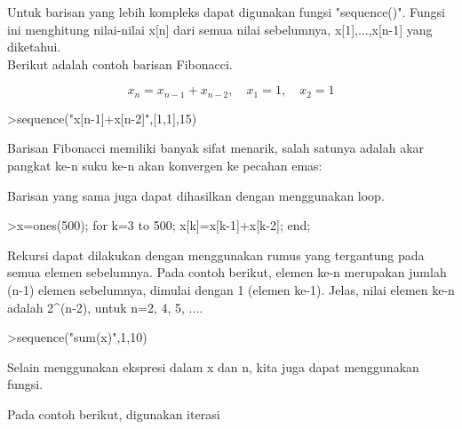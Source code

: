 \documentclass[a4paper,10pt]{article}
\begin{document}
\begin{eulernotebook}
\begin{eulercomment}
\begin{eulercomment}
\begin{eulercomment}
\begin{eulercomment}
\begin{eulercomment}
\begin{eulercomment}
\begin{eulercomment}
\begin{eulercomment}
\begin{eulercomment}
\begin{eulercomment}
\begin{eulercomment}
\begin{eulercomment}
\begin{eulercomment}
\begin{eulercomment}
\begin{eulercomment}
Untuk barisan yang lebih kompleks dapat digunakan fungsi "sequence()".
Fungsi ini menghitung nilai-nilai x[n] dari semua nilai sebelumnya,
x[1],...,x[n-1] yang diketahui.\\
Berikut adalah contoh barisan Fibonacci.

\end{eulercomment}
\begin{eulerformula}
\[
x_n = x_{n-1}+x_{n-2}, \quad x_1=1, \quad x_2 =1
\]
\end{eulerformula}
\begin{eulerprompt}
>sequence("x[n-1]+x[n-2]",[1,1],15)
\end{eulerprompt}
\begin{euleroutput}
  [1,  1,  2,  3,  5,  8,  13,  21,  34,  55,  89,  144,  233,  377,  610]
\end{euleroutput}
\begin{eulercomment}
Barisan Fibonacci memiliki banyak sifat menarik, salah satunya adalah
akar pangkat ke-n suku ke-n akan konvergen ke pecahan emas:
\end{eulercomment}
\begin{eulercomment}
Barisan yang sama juga dapat dihasilkan dengan menggunakan loop.
\end{eulercomment}
\begin{eulerprompt}
>x=ones(500); for k=3 to 500; x[k]=x[k-1]+x[k-2]; end;
\end{eulerprompt}
\begin{eulercomment}
Rekursi dapat dilakukan dengan menggunakan rumus yang tergantung pada
semua elemen sebelumnya. Pada contoh berikut, elemen ke-n merupakan
jumlah (n-1) elemen sebelumnya, dimulai dengan 1 (elemen ke-1). Jelas,
nilai elemen ke-n adalah 2\textasciicircum{}(n-2), untuk n=2, 4, 5, ....
\end{eulercomment}
\begin{eulerprompt}
>sequence("sum(x)",1,10)
\end{eulerprompt}
\begin{euleroutput}
  [1,  1,  2,  4,  8,  16,  32,  64,  128,  256]
\end{euleroutput}
\begin{eulercomment}
Selain menggunakan ekspresi dalam x dan n, kita juga dapat menggunakan
fungsi.

Pada contoh berikut, digunakan iterasi


\end{eulercomment}
\end{eulercomment}
\end{eulercomment}
\end{eulercomment}
\end{eulercomment}
\end{eulercomment}
\end{eulercomment}
\end{eulercomment}
\end{eulercomment}
\end{eulercomment}
\end{eulercomment}
\end{eulercomment}
\end{eulercomment}
\end{eulercomment}
\end{eulercomment}
\end{eulernotebook}
\end{document}
